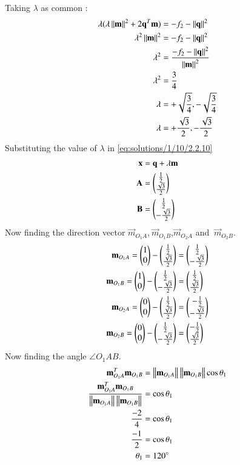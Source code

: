 Taking $\lambda$ as common :
\begin{align}
\lambda(\lambda\left\lVert\mathbf{m}\right\rVert^2+2\mathbf{q}^T\mathbf{m})&= -f_2-\left\lVert\mathbf{q}\right\rVert^2\\
\lambda^2\left\lVert\mathbf{m}\right\rVert^2&= -f_2-\left\lVert\mathbf{q}\right\rVert^2\\
\lambda^2&= \frac{-f_2-\left\lVert\mathbf{q}\right\rVert^2}{\left\lVert\mathbf{m}\right\rVert^2} \\
\lambda^2&= \frac{3}{4} \\
\lambda&= +\sqrt{\frac{3}{4}},-\sqrt{\frac{3}{4}} \\
\lambda&= +\frac{\sqrt{3}}{2},-\frac{\sqrt{3}}{2} 
\end{align}
Substituting the value of $\lambda$ in \eqref{eq:solutions/1/10/2.2.10}
\begin{align}
\mathbf{x}&= \mathbf{q}+\lambda\mathbf{m} \\
\mathbf{A}&= \begin{pmatrix}\frac{1}{2} \\ \frac{\sqrt{3}}{2}\end{pmatrix} \\
\mathbf{B}&= \begin{pmatrix}\frac{1}{2} \\ -\frac{\sqrt{3}}{2}\end{pmatrix}
\end{align} 
Now finding the direction vector $ \vec{m}_{O_1A}$,$\
\vec{m}_{O_1B}$,$ \vec{m}_{O_2A}$ and $\ \vec{m}_{O_2B}$.
\begin{align}
\mathbf{m}_{O_1A}=\begin{pmatrix}1\\0\end{pmatrix}-\begin{pmatrix}\frac{1}{2} \\ \frac{\sqrt{3}}{2}\end{pmatrix}&=\begin{pmatrix}\frac{1}{2}\\-\frac{\sqrt{3}}{2}\end{pmatrix}\\
\mathbf{m}_{O_1B}=\begin{pmatrix}1\\0\end{pmatrix}-\begin{pmatrix}\frac{1}{2} \\ -\frac{\sqrt{3}}{2}\end{pmatrix}&=\begin{pmatrix}\frac{1}{2}\\\frac{\sqrt{3}}{2}\end{pmatrix}\\
\mathbf{m}_{O_2A}=\begin{pmatrix}0\\0\end{pmatrix}-\begin{pmatrix}\frac{1}{2} \\ \frac{\sqrt{3}}{2}\end{pmatrix}&=\begin{pmatrix}-\frac{1}{2}\\-\frac{\sqrt{3}}{2}\end{pmatrix}\\
\mathbf{m}_{O_2B}=\begin{pmatrix}0\\0\end{pmatrix}-\begin{pmatrix}\frac{1}{2} \\ -\frac{\sqrt{3}}{2}\end{pmatrix}&=\begin{pmatrix}-\frac{1}{2}\\\frac{\sqrt{3}}{2}\end{pmatrix}
\end{align}
Now finding the angle $\angle{O_1AB}$.
\begin{align}
\mathbf{m}_{O_1A}^T \mathbf{m}_{O_1B}&=\left\lVert \mathbf{m}_{O_1A}\right\rVert\left\lVert\mathbf{m}_{O_1B}\right\rVert\cos\theta_1\\
\frac{\mathbf{m}_{O_1A}^T \mathbf{m}_{O_1B}}{\left\lVert \mathbf{m}_{O_1A}\right\rVert\left\lVert\mathbf{m}_{O_1B}\right\rVert}&=\cos\theta_1\\
\frac{-2}{4}&=\cos\theta_1\\
\frac{-1}{2}&=\cos\theta_1\\
\theta_1&=120^{\circ}
\end{align}
